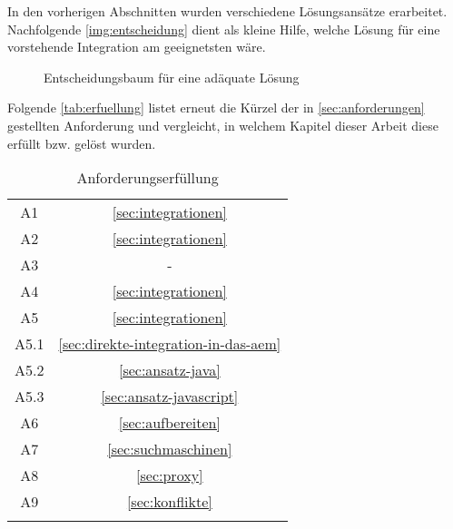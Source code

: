 In den vorherigen Abschnitten wurden verschiedene Lösungsansätze erarbeitet. Nachfolgende \autoref{img:entscheidung} dient als kleine Hilfe, welche Lösung für eine vorstehende Integration am geeignetsten wäre. \\
\begin{figure}[H]
	\begin{center}
		{\footnotesize}
		\caption{Entscheidungsbaum für eine adäquate Lösung}
		\label{img:entscheidung}
	\end{center}
\end{figure}
\missingall


Folgende \autoref{tab:erfuellung} listet erneut die Kürzel der in \autoref{sec:anforderungen} gestellten Anforderung und vergleicht, in welchem Kapitel dieser Arbeit diese erfüllt bzw. gelöst wurden.

\begin{longtable}{| c | c|} 
	\hline 
	\thead{Anforderung} & \thead{Gelöst in Kapitel} \\ 
	
	\hline 
	A1 &  \ref{sec:integrationen} \\ 
	\hline
	A2 &  \ref{sec:integrationen} \\  
	\hline
	A3 &  - \\  
	\hline 
	A4 &  \ref{sec:integrationen} \\   
	\hline
	A5 &  \ref{sec:integrationen} \\   
	\hline
	A5.1 &  \ref{sec:direkte-integration-in-das-aem}\\  
	\hline 
	A5.2 &  \ref{sec:ansatz-java} \\  
	\hline 
	A5.3 &  \ref{sec:ansatz-javascript}\\  
	\hline 
	A6 &  \ref{sec:aufbereiten} \\   
	\hline
	A7 &  \ref{sec:suchmaschinen} \\   
	\hline
	A8 &  \ref{sec:proxy}\\ 
	\hline 
	A9 & \ref{sec:konflikte}\\
	\hline
	\caption{Anforderungserfüllung}\label{tab:erfuellung}
\end{longtable}
